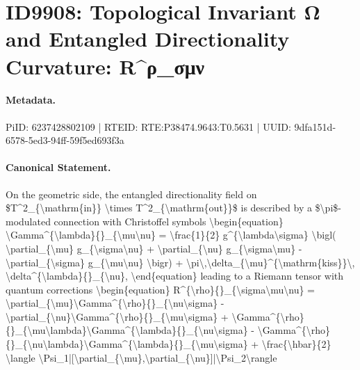 \section*{ID9908: Topological Invariant Ω and Entangled Directionality Curvature: R\textasciicircum{}ρ\_σμν}
\paragraph{Metadata.}
PiID: 6237428802109 | RTEID: RTE:P38474.9643:T0.5631 | UUID: 9dfa151d-6578-5ed3-94ff-59f5ed693f3a

\paragraph{Canonical Statement.}
On the geometric side, the entangled directionality field on \$T\textasciicircum{}2\_\{\textbackslash{}mathrm\{in\}\} \textbackslash{}times T\textasciicircum{}2\_\{\textbackslash{}mathrm\{out\}\}\$ is described by a \$\textbackslash{}pi\$-modulated connection with Christoffel symbols \textbackslash{}begin\{equation\} \textbackslash{}Gamma\textasciicircum{}\{\textbackslash{}lambda\}\{\}\_\{\textbackslash{}mu\textbackslash{}nu\} = \textbackslash{}frac\{1\}\{2\} g\textasciicircum{}\{\textbackslash{}lambda\textbackslash{}sigma\} \textbackslash{}bigl( \textbackslash{}partial\_\{\textbackslash{}mu\} g\_\{\textbackslash{}sigma\textbackslash{}nu\} + \textbackslash{}partial\_\{\textbackslash{}nu\} g\_\{\textbackslash{}sigma\textbackslash{}mu\} - \textbackslash{}partial\_\{\textbackslash{}sigma\} g\_\{\textbackslash{}mu\textbackslash{}nu\} \textbackslash{}bigr) + \textbackslash{}pi\textbackslash{},\textbackslash{}delta\_\{\textbackslash{}mu\}\textasciicircum{}\{\textbackslash{}mathrm\{kiss\}\}\textbackslash{}, \textbackslash{}delta\textasciicircum{}\{\textbackslash{}lambda\}\{\}\_\{\textbackslash{}nu\}, \textbackslash{}end\{equation\} leading to a Riemann tensor with quantum corrections \textbackslash{}begin\{equation\} R\textasciicircum{}\{\textbackslash{}rho\}\{\}\_\{\textbackslash{}sigma\textbackslash{}mu\textbackslash{}nu\} = \textbackslash{}partial\_\{\textbackslash{}mu\}\textbackslash{}Gamma\textasciicircum{}\{\textbackslash{}rho\}\{\}\_\{\textbackslash{}nu\textbackslash{}sigma\} - \textbackslash{}partial\_\{\textbackslash{}nu\}\textbackslash{}Gamma\textasciicircum{}\{\textbackslash{}rho\}\{\}\_\{\textbackslash{}mu\textbackslash{}sigma\} + \textbackslash{}Gamma\textasciicircum{}\{\textbackslash{}rho\}\{\}\_\{\textbackslash{}mu\textbackslash{}lambda\}\textbackslash{}Gamma\textasciicircum{}\{\textbackslash{}lambda\}\{\}\_\{\textbackslash{}nu\textbackslash{}sigma\} - \textbackslash{}Gamma\textasciicircum{}\{\textbackslash{}rho\}\{\}\_\{\textbackslash{}nu\textbackslash{}lambda\}\textbackslash{}Gamma\textasciicircum{}\{\textbackslash{}lambda\}\{\}\_\{\textbackslash{}mu\textbackslash{}sigma\} + \textbackslash{}frac\{\textbackslash{}hbar\}\{2\} \textbackslash{}langle \textbackslash{}Psi\_1|[\textbackslash{}partial\_\{\textbackslash{}mu\},\textbackslash{}partial\_\{\textbackslash{}nu\}]|\textbackslash{}Psi\_2\textbackslash{}rangle 